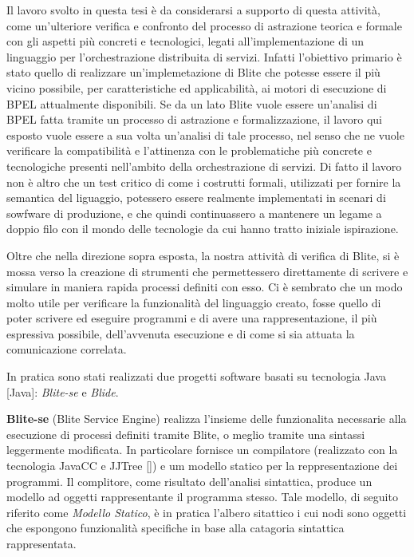Il lavoro svolto in questa tesi è da considerarsi a supporto di questa attività,
come un'ulteriore verifica e confronto del processo di astrazione teorica e
formale con gli aspetti più concreti e tecnologici, legati all'implementazione di
un linguaggio per l'orchestrazione distribuita di servizi. Infatti l'obiettivo
primario è stato quello di realizzare un'implemetazione di Blite che potesse
essere il più vicino possibile, per caratteristiche ed applicabilità, ai motori
di esecuzione di BPEL attualmente disponibili. Se da un lato Blite vuole essere
un'analisi di BPEL fatta tramite un processo di astrazione e formalizzazione, il
lavoro qui esposto vuole essere a sua volta un'analisi di tale processo, nel
senso che ne vuole verificare la compatibilità e l'attinenza con le problematiche
più concrete e tecnologiche presenti nell'ambito della orchestrazione di servizi.
Di fatto il lavoro non è altro che un test critico di come i costrutti formali,
utilizzati per fornire la semantica del liguaggio, potessero essere realmente
implementati in scenari di sowfware di produzione, e che quindi continuassero a
mantenere un legame a doppio filo con il mondo delle tecnologie da cui hanno
tratto iniziale ispirazione. 

Oltre che nella direzione sopra esposta, la nostra attività di verifica di
Blite, si è mossa verso la creazione di strumenti che permettessero
direttamente di scrivere e simulare in maniera rapida processi definiti con
esso. Ci è sembrato che un modo molto utile per verificare la funzionalità del
linguaggio creato, fosse quello di poter scrivere ed eseguire programmi e di avere una
rappresentazione, il più espressiva possibile, dell'avvenuta esecuzione e di
come si sia attuata la comunicazione correlata.

In pratica sono stati realizzati due progetti software basati su tecnologia
Java [Java]: \emph{Blite-se} e \emph{Blide}. 

\textbf{Blite-se} (Blite Service Engine) realizza l'insieme delle funzionalita
necessarie alla esecuzione di processi definiti tramite Blite, o meglio tramite una sintassi
leggermente modificata. In particolare fornisce un compilatore (realizzato con la
tecnologia JavaCC e JJTree []) e um modello statico per la reppresentazione dei
programmi. Il complitore, come risultato dell'analisi sintattica, produce un modello ad
oggetti rappresentante il programma stesso. Tale modello, di seguito riferito come
\emph{Modello Statico}, è in pratica l'albero sitattico i cui nodi sono oggetti
che espongono funzionalità specifiche in base alla catagoria sintattica rappresentata. 

